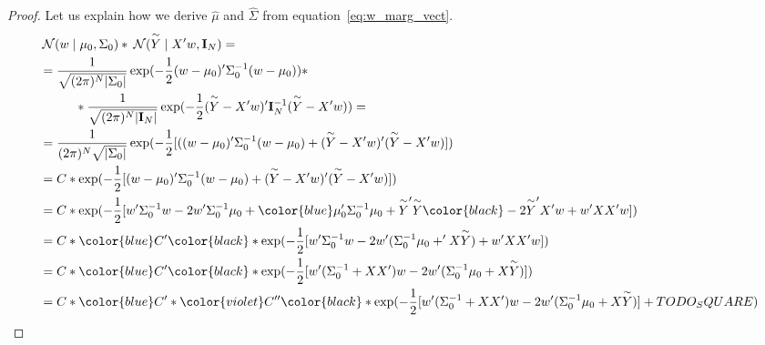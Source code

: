 \begin{proof}
Let us explain how we derive $\hat{\mu}$ and $\hat{\Sigma}$ from equation~\ref{eq:w_marg_vect}.
\begin{align}
& \norm(w \mid \mu_0, \Sigma_0) * \norm(\Yh \mid X'w, \unity_N) = \\
&= \frac{1}{\sqrt{(2\pi)^N|\Sigma_0|}}\exp({-\frac{1}{2}(w-\mu_0)'\Sigma_0^{-1}(w-\mu_0)}) * 
    \notag\\ &\mspace{50mu} 
    * \frac{1}{\sqrt{(2\pi)^N|\unity_N|}}\exp({-\frac{1}{2}(\Yh-X'w)'\unity_N^{-1}(\Yh-X'w)}) = \\
&= \frac{1}{(2\pi)^N \sqrt{|\Sigma_0|}}\exp({-\frac{1}{2}[((w-\mu_0)'\Sigma_0^{-1}(w-\mu_0) +  (\Yh-X'w)'(\Yh-X'w)]}) \\
&= C* \exp({-\frac{1}{2}[(w-\mu_0)'\Sigma_0^{-1}(w-\mu_0) +  (\Yh-X'w)'(\Yh-X'w)]}) \\
&= C* \exp({-\frac{1}{2}[w'\Sigma_0^{-1} w - 2w'\Sigma_0^{-1}\mu_0 + \color{blue}\mu_0'\Sigma_0^{-1}\mu_0 + \Yh'\Yh \color{black}-2\Yh'X'w  + w'XX'w]}) \\
&= C* \color{blue} C' \color{black} * \exp({-\frac{1}{2}[w'\Sigma_0^{-1} w - 2w'(\Sigma_0^{-1}\mu_0  + 'X\Yh)  + w'XX'w]}) \\
&= C* \color{blue} C' \color{black} * \exp({-\frac{1}{2}[w'(\Sigma_0^{-1} + XX') w - 2w'(\Sigma_0^{-1}\mu_0  + X\Yh)]}) \\
&= C* \color{blue} C' *\color{violet} C'' \color{black} * \exp({-\frac{1}{2}[w'(\Sigma_0^{-1} + XX') w - 2w'(\Sigma_0^{-1}\mu_0  + X\Yh)] + TODO_SQUARE })
\end{align}
\end{proof}

